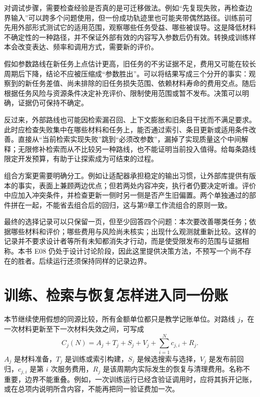 对调试步骤，需要检查经验是否真的是可迁移做法。例如“先复现失败，再检查边界输入”可以跨多个问题使用，但一份成功轨迹里也可能夹带偶然路径。训练前可先用外部形式测试它的适用范围，观察哪些任务受益、哪些被误导。这是降低材料不确定性的一种路径，并不保证外部有效的内容写入参数后仍有效。转换成训练样本会改变表达、频率和调用方式，需要新的评价。

假如参数路线在新任务上点估计更高，旧任务的不劣证据不足，费用又可能在较长周期后下降，结论不应被压缩成“参数胜出”。可以将结果写成三个分开的事实：观察到的新任务差值、尚未排除的旧任务损失范围、依赖材料寿命的费用交点。随后根据任务风险与资源条件决定补充评价、限制使用范围或暂不发布。决策可以明确，证据仍可保持不确定。

反过来，外部路线也可能因检索漏召回、上下文膨胀和旧条目干扰而不满足要求。此时应检查失败集中在哪些材料和任务上，能否通过索引、条目更新或适用条件改善。直接从“当前检索实现失败”跳到“必须改参数”，漏掉了实现质量这个中间解释；无限修补检索而从不比较另一种路线，也不能证明当前投入值得。给每条路线限定开发预算，有助于让探索成为可结束的过程。

组合方案更需要明确分工。例如让适配器承担稳定的输出习惯，让外部库提供有版本的事实，表面上兼顾两边优点；但若两处内容冲突，执行者仍要决定听谁。评价中应加入冲突条件，并检查更新一侧时另一侧是否产生旧偏置。两个单独通过的部件拼在一起，不能省去组合后的回归，这与第9章工作流组合的原则一致。

最终的选择记录可以只保留一页，但至少回答四个问题：本次要改善哪类任务；依据哪些材料和评价；哪些费用与风险尚未核实；出现什么观测就重新比较。这样的记录并不要求设计者等所有未知都消失才行动，而是使受限发布的范围与证据相称。本书 E08 仍处于设计讨论阶段，因此这里提供决策方法，不预写一个尚不存在的胜者。后续运行还须保持同样的记录边界。


\section{训练、检索与恢复怎样进入同一份账}
\label{sec:ch10-lifecyclecost}

本节继续使用假想的同源比较，所有金额单位都只是教学记账单位。对路线 $j$，在一次材料更新至下一次材料失效之间，可写成
\begin{equation}
 C_j(N)=A_j+T_j+S_j+V_j+\sum_{i=1}^{N}c_{j,i}+R_j.
 \label{eq:ch10-lifecyclecost}
\end{equation}
$A_j$ 是材料准备，$T_j$ 是训练或索引构建，$S_j$ 是候选搜索与选择，$V_j$ 是发布前回归，$c_{j,i}$ 是第 $i$ 次服务费用，$R_j$ 是该周期内实际发生的恢复与清理费用。名称不重要，边界不能重叠。例如，一次训练运行已经含验证调用时，应将其拆开记账，或在总项内说明所含内容，不能再把同一验证费加一次。

